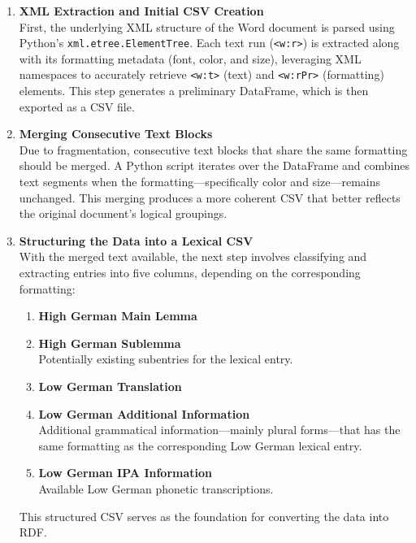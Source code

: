\documentclass{article}
\begin{document}
\begin{enumerate}
    \item \textsf{\textbf{XML Extraction and Initial CSV Creation}}\\  
    First, the underlying XML structure of the Word document is parsed using Python’s \texttt{xml.etree.ElementTree}. Each text run (\texttt{<w:r>}) is extracted along with its formatting metadata (font, color, and size), leveraging XML namespaces to accurately retrieve \texttt{<w:t>} (text) and \texttt{<w:rPr>} (formatting) elements. This step generates a preliminary DataFrame, which is then exported as a CSV file.

    \item \textsf{\textbf{Merging Consecutive Text Blocks}}\\  
    Due to fragmentation, consecutive text blocks that share the same formatting should be merged. A Python script iterates over the DataFrame and combines text segments when the formatting—specifically color and size—remains unchanged. This merging produces a more coherent CSV that better reflects the original document’s logical groupings.

    \item \textsf{\textbf{Structuring the Data into a Lexical CSV}}\\  
    With the merged text available, the next step involves classifying and extracting entries into five columns, depending on the corresponding formatting:
    \begin{enumerate}
        \item \textsf{\textbf{High German Main Lemma}}
        \item \textsf{\textbf{High German Sublemma}}\\Potentially existing subentries for the lexical entry.
        \item \textsf{\textbf{Low German Translation}}
        \item \textsf{\textbf{Low German Additional Information}}\\ Additional grammatical information—mainly plural forms—that has the same formatting as the corresponding Low German lexical entry.
        \item \textsf{\textbf{Low German IPA Information}}\\Available Low German phonetic transcriptions.
    \end{enumerate}
    This structured CSV serves as the foundation for converting the data into RDF.


\end{enumerate}
\end{document}
